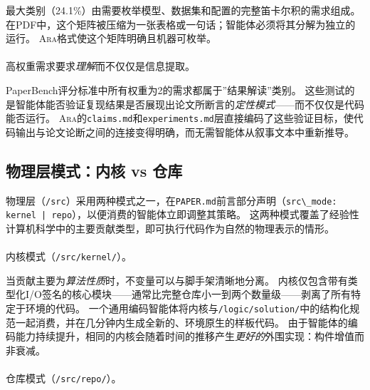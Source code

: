 \documentclass[
]{article}
\makeatletter
\let\oldparagraph\paragraph
\renewcommand{\paragraph}{
    \@ifstar
      \xxxParagraphStar
      \xxxParagraphNoStar
  }
\newcommand{\xxxParagraphStar}[1]{\oldparagraph*{#1}\mbox{}}
\newcommand{\xxxParagraphNoStar}[1]{\oldparagraph{#1}\mbox{}}
\newcommand{\passthrough}[1]{#1}
\theoremstyle{definition}
\newcommand{\ara}{\textsc{Ara}}
\makeatother
\begin{document}
最大类别（24.1\%）由需要枚举模型、数据集和配置的完整笛卡尔积的需求组成。
在PDF中，这个矩阵被压缩为一张表格或一句话；智能体必须将其分解为独立的运行。
\ara{}格式使这个矩阵明确且机器可枚举。

\paragraph{\texorpdfstring{高权重需求要求\emph{理解}而不仅仅是信息提取。}{高权重需求要求理解而不仅仅是信息提取。}}\label{ux9ad8ux6743ux91cdux9700ux6c42ux8981ux6c42ux7406ux89e3ux800cux4e0dux4ec5ux4ec5ux662fux4fe1ux606fux63d0ux53d6}

PaperBench评分标准中所有权重为2的需求都属于''结果解读''类别。
这些测试的是智能体能否验证复现结果是否展现出论文所断言的\emph{定性模式}------而不仅仅是代码能否运行。
\ara{}的\passthrough{\lstinline!claims.md!}和\passthrough{\lstinline!experiments.md!}层直接编码了这些验证目标，使代码输出与论文论断之间的连接变得明确，而无需智能体从叙事文本中重新推导。

\subsection{物理层模式：内核 vs 仓库}\label{sec-app-src-modes}

物理层（\passthrough{\lstinline!/src!}）采用两种模式之一，在\passthrough{\lstinline!PAPER.md!}前言部分声明（\passthrough{\lstinline!src\_mode: kernel | repo!}），以便消费的智能体立即调整其策略。
这两种模式覆盖了经验性计算机科学中的主要贡献类型，即可执行代码作为自然的物理表示的情形。

\paragraph{\texorpdfstring{内核模式（\texttt{/src/kernel/}）。}{内核模式（/src/kernel/）。}}\label{ux5185ux6838ux6a21ux5f0fsrckernel}

当贡献主要为\emph{算法性质}时，不变量可以与脚手架清晰地分离。
内核仅包含带有类型化I/O签名的核心模块------通常比完整仓库小一到两个数量级------剥离了所有特定于环境的代码。
一个通用编码智能体将内核与\passthrough{\lstinline!/logic/solution/!}中的结构化规范一起消费，并在几分钟内生成全新的、环境原生的样板代码。
由于智能体的编码能力持续提升，相同的内核会随着时间的推移产生\emph{更好的}外围实现：构件增值而非衰减。

\paragraph{\texorpdfstring{仓库模式（\texttt{/src/repo/}）。}{仓库模式（/src/repo/）。}}\label{ux4ed3ux5e93ux6a21ux5f0fsrcrepo}
\end{document}
